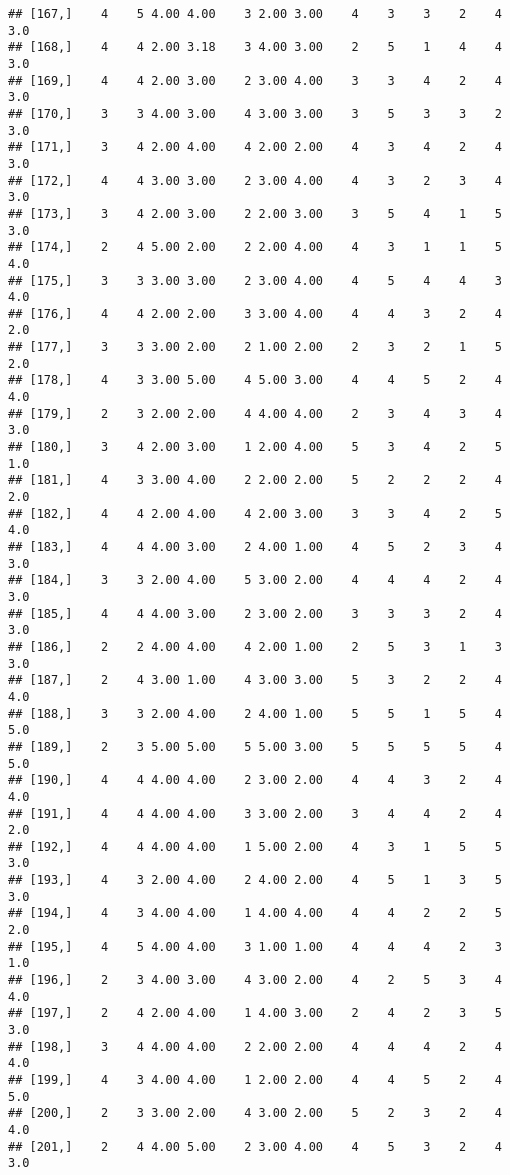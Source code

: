 \documentclass[]{article}
\begin{document}
\begin{verbatim}
## [167,]    4    5 4.00 4.00    3 2.00 3.00    4    3    3    2    4  3.0
## [168,]    4    4 2.00 3.18    3 4.00 3.00    2    5    1    4    4  3.0
## [169,]    4    4 2.00 3.00    2 3.00 4.00    3    3    4    2    4  3.0
## [170,]    3    3 4.00 3.00    4 3.00 3.00    3    5    3    3    2  3.0
## [171,]    3    4 2.00 4.00    4 2.00 2.00    4    3    4    2    4  3.0
## [172,]    4    4 3.00 3.00    2 3.00 4.00    4    3    2    3    4  3.0
## [173,]    3    4 2.00 3.00    2 2.00 3.00    3    5    4    1    5  3.0
## [174,]    2    4 5.00 2.00    2 2.00 4.00    4    3    1    1    5  4.0
## [175,]    3    3 3.00 3.00    2 3.00 4.00    4    5    4    4    3  4.0
## [176,]    4    4 2.00 2.00    3 3.00 4.00    4    4    3    2    4  2.0
## [177,]    3    3 3.00 2.00    2 1.00 2.00    2    3    2    1    5  2.0
## [178,]    4    3 3.00 5.00    4 5.00 3.00    4    4    5    2    4  4.0
## [179,]    2    3 2.00 2.00    4 4.00 4.00    2    3    4    3    4  3.0
## [180,]    3    4 2.00 3.00    1 2.00 4.00    5    3    4    2    5  1.0
## [181,]    4    3 3.00 4.00    2 2.00 2.00    5    2    2    2    4  2.0
## [182,]    4    4 2.00 4.00    4 2.00 3.00    3    3    4    2    5  4.0
## [183,]    4    4 4.00 3.00    2 4.00 1.00    4    5    2    3    4  3.0
## [184,]    3    3 2.00 4.00    5 3.00 2.00    4    4    4    2    4  3.0
## [185,]    4    4 4.00 3.00    2 3.00 2.00    3    3    3    2    4  3.0
## [186,]    2    2 4.00 4.00    4 2.00 1.00    2    5    3    1    3  3.0
## [187,]    2    4 3.00 1.00    4 3.00 3.00    5    3    2    2    4  4.0
## [188,]    3    3 2.00 4.00    2 4.00 1.00    5    5    1    5    4  5.0
## [189,]    2    3 5.00 5.00    5 5.00 3.00    5    5    5    5    4  5.0
## [190,]    4    4 4.00 4.00    2 3.00 2.00    4    4    3    2    4  4.0
## [191,]    4    4 4.00 4.00    3 3.00 2.00    3    4    4    2    4  2.0
## [192,]    4    4 4.00 4.00    1 5.00 2.00    4    3    1    5    5  3.0
## [193,]    4    3 2.00 4.00    2 4.00 2.00    4    5    1    3    5  3.0
## [194,]    4    3 4.00 4.00    1 4.00 4.00    4    4    2    2    5  2.0
## [195,]    4    5 4.00 4.00    3 1.00 1.00    4    4    4    2    3  1.0
## [196,]    2    3 4.00 3.00    4 3.00 2.00    4    2    5    3    4  4.0
## [197,]    2    4 2.00 4.00    1 4.00 3.00    2    4    2    3    5  3.0
## [198,]    3    4 4.00 4.00    2 2.00 2.00    4    4    4    2    4  4.0
## [199,]    4    3 4.00 4.00    1 2.00 2.00    4    4    5    2    4  5.0
## [200,]    2    3 3.00 2.00    4 3.00 2.00    5    2    3    2    4  4.0
## [201,]    2    4 4.00 5.00    2 3.00 4.00    4    5    3    2    4  3.0

\end{verbatim}
\end{document}
